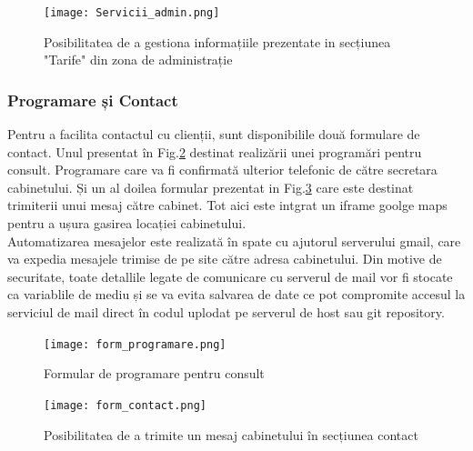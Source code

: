 \documentclass[11pt]{scrartcl} %
\begin{document}
\begin{figure}[h] %
	\centering
	\texttt{[image: Servicii\_admin.png]} %
	\caption{Posibilitatea de a gestiona informațiile prezentate in secțiunea "Tarife" din zona de administrație}
	\label{fig:serv_admin}
\end{figure}



\subsubsection{Programare și Contact}

Pentru a facilita contactul cu clienții, sunt disponibilile două formulare de contact. Unul presentat în Fig.\ref{fig:form_prog} destinat realizării unei programări pentru consult. Programare care va fi confirmată ulterior telefonic de către secretara cabinetului. Și un al doilea formular prezentat in Fig.\ref{fig:form_contact} care este destinat trimiterii unui mesaj către cabinet. Tot aici este intgrat un iframe goolge maps pentru a ușura gasirea locației cabinetului.\\
Automatizarea mesajelor este realizată în spate cu ajutorul serverului gmail, care va expedia mesajele trimise de pe site către adresa cabinetului. Din motive de securitate, toate detallile legate de comunicare cu serverul de mail vor fi stocate ca variablile de mediu și se va evita salvarea de date ce pot compromite accesul la serviciul de mail direct în codul uplodat pe serverul de host sau git repository.


 

\begin{figure}[h] %
	\centering
	\texttt{[image: form\_programare.png]} %
	\caption{Formular de programare pentru consult}
	\label{fig:form_prog}
\end{figure}

\begin{figure}[h] %
	\centering
	\texttt{[image: form\_contact.png]} %
	\caption{Posibilitatea de a trimite un mesaj cabinetului în secțiunea contact}
	\label{fig:form_contact}
\end{figure}
\end{document}
